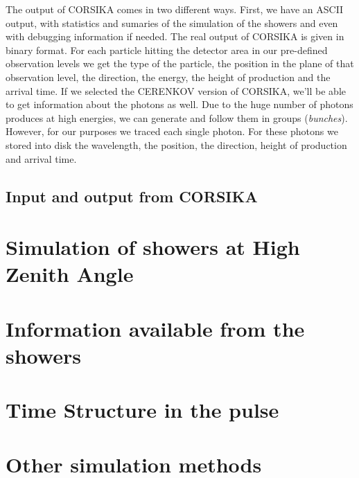 The output of CORSIKA comes in two different ways. First, we have an
ASCII output, with statistics and sumaries of the simulation of the
showers and even with debugging information if needed.  The real
output of CORSIKA is given in binary format. For each particle hitting
the detector area in our pre-defined observation levels we get the
type of the particle, the position in the plane of that observation
level, the direction, the energy, the height of production and the
arrival time. If we selected the CERENKOV version of CORSIKA, we'll be
able to get information about the \Cherenkov photons as well. Due to
the huge number of \Cherenkov photons produces at high energies, we
can generate and follow them in groups (\emph{bunches}).  However, for
our purposes we traced each single \Cherenkov photon. For these
photons we stored into disk the wavelength, the position, the
direction, height of production and arrival time.

\subsection{Input and output from CORSIKA}
%

\section{Simulation of showers at High Zenith Angle}

\section{Information available from the showers}

\section{Time Structure in the \Cherenkov pulse}

\section{Other simulation methods}

\endinput
%
